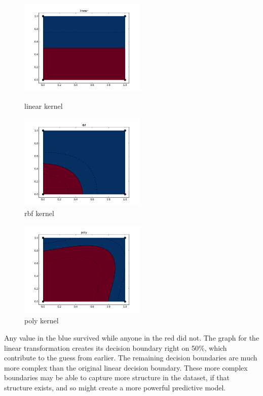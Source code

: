 \documentclass{article}
\begin{document}
\begin{figure}[ht]
\begin{minipage}[b]{0.45\linewidth}
\includegraphics[width=2.4in]{eps/test_SVM_linear.png}
\caption{linear kernel}
\label{fig:figure1}
\end{minipage}
\begin{minipage}[b]{0.45\linewidth}
\centering
\includegraphics[width=2.4in]{eps/test_SVM_rbf.png}
\caption{rbf kernel}
\label{fig:figure2}
\end{minipage}
\end{figure}

\begin{figure}[h]
\centering
\includegraphics[width=2.4in]{eps/test_SVM_poly.png}
\caption{poly kernel}
\label {fig:pre}
\end{figure}

Any value in the blue survived while anyone in the red did not. The graph for the linear transformation creates its decision boundary right on 50\%, which contribute to the guess from earlier. The remaining decision boundaries are much more complex than the original linear decision boundary. These more complex boundaries may be able to capture more structure in the dataset, if that structure exists, and so might create a more powerful predictive model.\\
\end{document}
